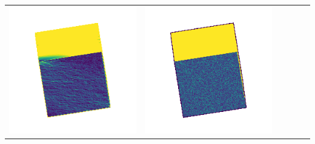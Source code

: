 \begin{center}
\begin{tabularx}{\linewidth}{@{}Y@{}Y@{}Y@{}Y@{}Y@{}Y@{}}
\includegraphics[width=\linewidth]{semisynthetic/20160617_0_yu_err.png} &
\includegraphics[width=\linewidth]{semisynthetic/20160617_0_dpsn_err.png} &

\end{tabularx}
\end{center}

